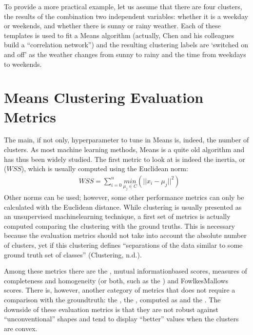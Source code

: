 \documentclass[letterpaper,10pt,english]{jupyterBook}
\begin{document}
\sphinxAtStartPar
To provide a more practical example, let us assume that there are four clusters, the results of the combination two independent variables: whether it is a weekday or weekends, and whether there is sunny or rainy weather. Each of these templates is used to fit a \sphinxhyphen{}Means algorithm (actually, Chen and his colleagues build a “correlation network”) and the resulting clustering labels are ‘switched on and off’ as the weather changes from sunny to rainy and the time from weekdays to weekends.


\section{\sphinxhyphen{}Means Clustering Evaluation Metrics}
\label{\detokenize{04-stations_kmeans:k-means-clustering-evaluation-metrics}}
\sphinxAtStartPar
The main, if not only, hyperparameter to tune in \sphinxhyphen{}Means is, indeed, the number of clusters.
As most machine learning methods, \sphinxhyphen{}Means is a quite old algorithm and has thus been widely studied.
The first metric to look at is indeed the inertia, or  (\(WSS\)), which is usually computed using the Euclidean norm:
\label{equation:04-stations_kmeans:f7e3694c-3415-4224-8c96-2b755bc7e4eb}\begin{align}
& WSS = \sum_{i=0}^{n}\underset{\mu_{j}\in{C}}{min}(||x_{i} - \mu_{j}||^2)
\end{align}
\sphinxAtStartPar
Other norms can be used; however, some other performance metrics can only be calculated with the Euclidean distance. While clustering is usually presented as an unsupervised machine\sphinxhyphen{}learning technique, a first set of metrics is actually computed comparing the clustering with the ground truths. This is necessary because the evaluation metrics should not take into account the absolute number of clusters, yet if this clustering defines “separations of the data similar to some ground truth set of classes” (Clustering, n.d.).

\sphinxAtStartPar
Among these metrics there are the , mutual information\sphinxhyphen{}based scores, measures of completeness and homogeneity (or both, such as the ) and Fowlkes\sphinxhyphen{}Mallows scores. There is, however, another category of metrics that does not require a comparison with the ground\sphinxhyphen{}truth: the , the , computed as  and  the . The downside of these evaluation metrics is that they are not robust against “unconventional” shapes and tend to display “better” values when the clusters are convex.
\end{document}
